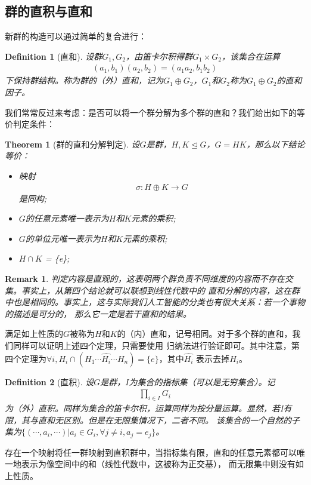\documentclass[12pt,a4paper,UTF8]{ctexbook}
\theoremstyle{plain}
\newtheorem{theorem}{\indent Theorem}[section]
\newtheorem{definition}{\indent Definition}[section]
\newtheorem{remark}{\indent Remark}[section]
\begin{document}
\subsection{群的直积与直和}
新群的构造可以通过简单的复合进行：
\begin{definition}[直和]
    设群$G_1,G_2$，由笛卡尔积得群$G_1\times G_2$，该集合在运算
    \begin{align*} 
    (a_1,b_1)(a_2,b_2) = (a_1a_2,b_1b_2)
    \end{align*}
    下保持群结构。称为群的（外）直和，记为$G_1\oplus G_2$，$G_1$和$G_2$称为$G_1\oplus G_2$的直和因子。
\end{definition}
我们常常反过来考虑：是否可以将一个群分解为多个群的直和？我们给出如下的等价判定条件：
\begin{theorem}[群的直和分解判定]
    设$G$是群，$H,K\trianglelefteq G$，$G=HK$，那么以下结论等价：
    \begin{itemize}
        \item 映射 
        \begin{align*}
            \sigma: H\oplus K \to G 
        \end{align*}
        是同构;
        \item $G$的任意元素唯一表示为$H$和$K$元素的乘积;
        \item $G$的单位元唯一表示为$H$和$K$元素的乘积;
        \item $H\cap K$ = \{e\};
    \end{itemize}
\end{theorem}
\begin{remark}
    判定内容是直观的，这表明两个群负责不同维度的内容而不存在交集。事实上，从第四个结论就可以联想到线性代数中的
    直和分解的内容，这在群中也是相同的。事实上，这与实际我们人工智能的分类也有很大关系：若一个事物的描述是可分的，
    那么它一定是若干直和的结果。
\end{remark}
满足如上性质的$G$被称为$H$和$K$的（内）直和，记号相同。对于多个群的直和，我们同样可以证明上述四个定理，只需要使用
归纳法进行验证即可。其中注意，第四个定理为$\forall i,H_i\cap(H_1\cdots \hat{H_i}\cdots H_n)=\{e\}$，其中$\hat{H_i}$
表示去掉$H_i$。
\begin{definition}[直积]
    设$G$是群，$I$为集合的指标集（可以是无穷集合）。记
    \begin{align*}
         \prod_{i\in I}G_i
    \end{align*}
    为（外）直积。同样为集合的笛卡尔积，运算同样为按分量运算。显然，若I有限，其与直和无区别。但是在无限集情况下，二者不同。
    该集合的一个自然的子集为$\{(\cdots,a_i,\cdots)|a_i\in G_i, \forall j \ne i, a_j = e_j\}$。
\end{definition}
存在一个映射将任一群映射到直积群中，当指标集有限，直和的任意元素都可以唯一地表示为像空间中的和（线性代数中，这被称为正交基），
而无限集中则没有如上性质。
\end{document}
